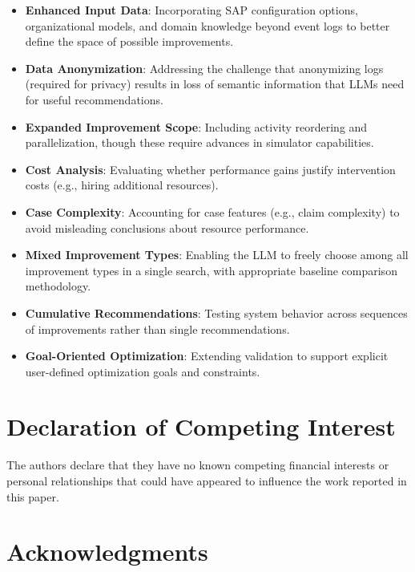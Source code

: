 \documentclass[preprint,12pt]{elsarticle}
\begin{document}
\begin{itemize}
    \item \textbf{Enhanced Input Data}: Incorporating SAP configuration options, organizational models, and domain knowledge beyond event logs to better define the space of possible improvements.

    \item \textbf{Data Anonymization}: Addressing the challenge that anonymizing logs (required for privacy) results in loss of semantic information that LLMs need for useful recommendations.

    \item \textbf{Expanded Improvement Scope}: Including activity reordering and parallelization, though these require advances in simulator capabilities.

    \item \textbf{Cost Analysis}: Evaluating whether performance gains justify intervention costs (e.g., hiring additional resources).

    \item \textbf{Case Complexity}: Accounting for case features (e.g., claim complexity) to avoid misleading conclusions about resource performance.

    \item \textbf{Mixed Improvement Types}: Enabling the LLM to freely choose among all improvement types in a single search, with appropriate baseline comparison methodology.

    \item \textbf{Cumulative Recommendations}: Testing system behavior across sequences of improvements rather than single recommendations.

    \item \textbf{Goal-Oriented Optimization}: Extending validation to support explicit user-defined optimization goals and constraints.
\end{itemize}

\section*{Declaration of Competing Interest}

The authors declare that they have no known competing financial interests or personal relationships that could have appeared to influence the work reported in this paper.

\section*{Acknowledgments}




\end{document}
